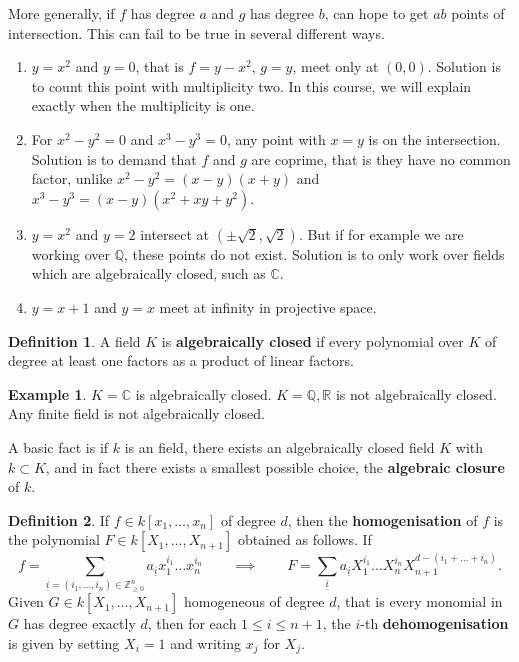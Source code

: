 \documentclass{article}
\newcommand{\Z}{\mathbb{Z}}
\newcommand{\Q}{\mathbb{Q}}
\newcommand{\R}{\mathbb{R}}
\newcommand{\C}{\mathbb{C}}
\newcommand{\rb}[1]{\left( #1 \right)}
\renewcommand{\sb}[1]{\left[ #1 \right]}
\theoremstyle{definition}\newtheorem{definition}{Definition}[section]
\theoremstyle{definition}\newtheorem{remark}[definition]{Remark}
\theoremstyle{definition}\newtheorem*{example}{Example}
\theoremstyle{definition}\newtheorem*{note}{Note}
\begin{document}
More generally, if $ f $ has degree $ a $ and $ g $ has degree $ b $, can hope to get $ ab $ points of intersection. This can fail to be true in several different ways.
\begin{enumerate}
\item $ y = x^2 $ and $ y = 0 $, that is $ f = y - x^2 $, $ g = y $, meet only at $ \rb{0, 0} $. Solution is to count this point with multiplicity two. In this course, we will explain exactly when the multiplicity is one.
\item For $ x^2 - y^2 = 0 $ and $ x^3 - y^3 = 0 $, any point with $ x = y $ is on the intersection. Solution is to demand that $ f $ and $ g $ are coprime, that is they have no common factor, unlike $ x^2 - y^2 = \rb{x - y}\rb{x + y} $ and $ x^3 - y^3 = \rb{x - y}\rb{x^2 + xy + y^2} $.
\item $ y = x^2 $ and $ y = 2 $ intersect at $ \rb{\pm \sqrt{2}, \sqrt{2}} $. But if for example we are working over $ \Q $, these points do not exist. Solution is to only work over fields which are algebraically closed, such as $ \C $.
\item $ y = x + 1 $ and $ y = x $ meet at infinity in projective space.
\end{enumerate}

\begin{definition}
A field $ K $ is \textbf{algebraically closed} if every polynomial over $ K $ of degree at least one factors as a product of linear factors.
\end{definition}

\begin{example}
$ K = \C $ is algebraically closed. $ K = \Q, \R $ is not algebraically closed. Any finite field is not algebraically closed.
\end{example}

A basic fact is if $ k $ is an field, there exists an algebraically closed field $ K $ with $ k \subset K $, and in fact there exists a smallest possible choice, the \textbf{algebraic closure} of $ k $.


\begin{definition}
If $ f \in k\sb{x_1, \dots, x_n} $ of degree $ d $, then the \textbf{homogenisation} of $ f $ is the polynomial $ F \in k\sb{X_1, \dots, X_{n + 1}} $ obtained as follows. If
$$ f = \sum_{\underline{i} = \rb{i_1, \dots, i_n} \in \Z_{\ge 0}^n} a_{\underline{i}}x_1^{i_1} \dots x_n^{i_n} \qquad \implies \qquad F = \sum_{\underline{i}} a_{\underline{i}}X_1^{i_1} \dots X_n^{i_n}X_{n + 1}^{d - \rb{i_1 + \dots + i_n}}. $$
Given $ G \in k\sb{X_1, \dots, X_{n + 1}} $ homogeneous of degree $ d $, that is every monomial in $ G $ has degree exactly $ d $, then for each $ 1 \le i \le n + 1 $, the $ i $-th \textbf{dehomogenisation} is given by setting $ X_i = 1 $ and writing $ x_j $ for $ X_j $.
\end{definition}
\end{document}
